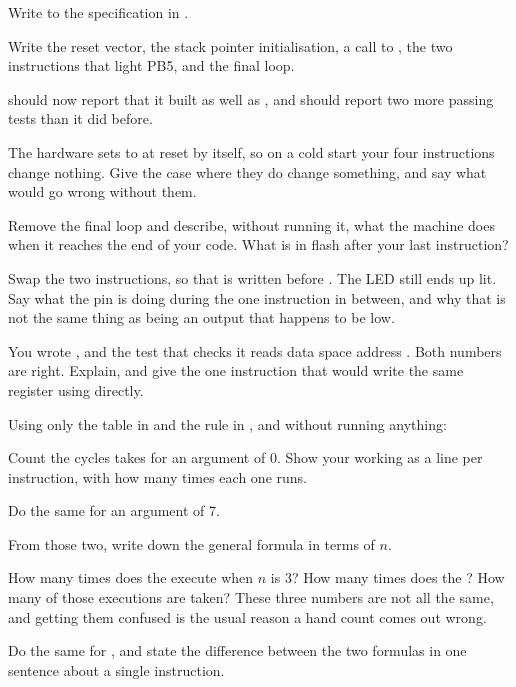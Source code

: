 \label{c1:ex:program}
Write  to the specification in .
\begin{parts}
  \item Write the reset vector, the stack pointer initialisation, a call to , the
    two instructions that light PB5, and the final loop.
  \item {} should now report that it built  as well as
    , and  should report two more passing tests than it did
    before.
  \item The hardware sets  to  at reset by itself, so on a cold start your
    four instructions change nothing. Give the case where they do change something, and say what
    would go wrong without them.
  \item Remove the final loop and describe, without running it, what the machine does when it
    reaches the end of your code. What is in flash after your last instruction?
  \item Swap the two  instructions, so that  is written before .
    The LED still ends up lit. Say what the pin is doing during the one instruction in between,
    and why that is not the same thing as being an output that happens to be low.
  \item You wrote , and the test that checks it reads data space address
    . Both numbers are right. Explain, and give the one instruction that would write the
    same register using  directly.
\end{parts}

\label{c1:ex:counting}
Using only the table in  and the rule in , and without
running anything:
\begin{parts}
  \item Count the cycles  takes for an argument of 0. Show your working as a line
    per instruction, with how many times each one runs.
  \item Do the same for an argument of 7.
  \item From those two, write down the general formula in terms of $n$.
  \item How many times does the  execute when $n$ is 3? How many times does the
    ? How many of those  executions are taken? These three numbers are not
    all the same, and getting them confused is the usual reason a hand count comes out wrong.
  \item Do the same for , and state the difference between the two
    formulas in one sentence about a single instruction.
\end{parts}


